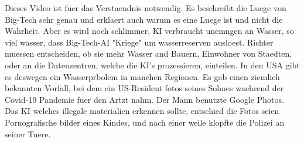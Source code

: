 \documentclass{report}
\begin{document}
\newline
\citep{ai-extinction-lie} Dieses Video ist fuer das Verstaendnis notwendig. Es beschreibt die Luege von Big-Tech sehr genau und erklaert auch warum es eine Luege ist und nicht die Wahrheit.
\newline
\newline
Aber es wird noch schlimmer, KI verbraucht unemngen an Wasser, so viel wasser, dass Big-Tech-AI "Kriege" um wasserreserven ausloest. Richter muessen entscheiden, ob sie mehr Wasser and Bauern, Einwohner von Staedten, oder an die Datenzentren, welche die KI's prozessieren, einteilen.
In den USA gibt es deswegen ein Wasserprbolem in manchen Regionen. \citep{ai-water-wars}
\newline
\newline
Es gab einen ziemlich bekannten Vorfall, bei dem ein US-Resident fotos seines Sohnes waehrend der Covid-19 Pandemie fuer den Artzt nahm. Der Mann benutzte Google Photos. Das KI welches illegale materialien erkennen sollte, entschied die Fotos seien Pornografische bilder eines Kindes, und nach einer weile klopfte die Polizei an seiner Tuere. \citep{google-photos-false-flagging}
\end{document}
